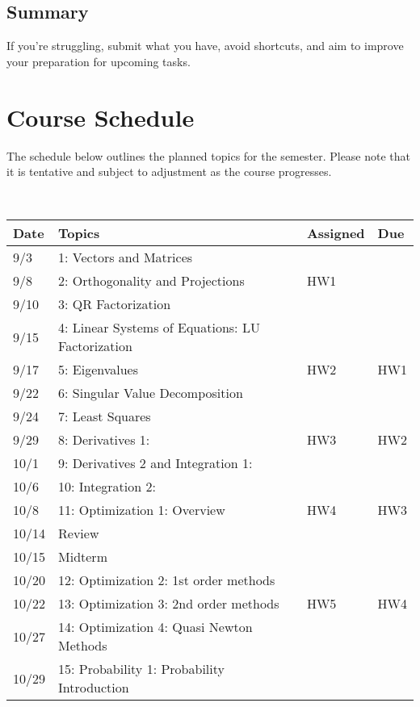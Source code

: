 \documentclass[11pt]{article}
\begin{document}
\subsection*{Summary}

If you're struggling, submit what you have, avoid shortcuts, and aim to improve your preparation for upcoming tasks.

\section*{Course Schedule}

The schedule below outlines the planned topics for the semester. Please note that it is tentative and subject to adjustment as the course progresses.

~\\
\small
\begin{centering}
\begin{tabular}{||l|p{3in}|l|l||}
\hline\hline
Date & Topics  & Assigned & Due  \\
\hline\hline
9/3 & 1: Vectors and Matrices &   & \\
\hline
9/8 & 2: Orthogonality and Projections & HW1   & \\
9/10& 3: QR Factorization &   & \\
\hline
9/15 &  4: Linear Systems of Equations: LU Factorization &  &  \\
9/17& 5: Eigenvalues & HW2 & HW1  \\
\hline
9/22& 6: Singular Value Decomposition &   &   \\
9/24 & 7: Least Squares  &  & \\
\hline
9/29 & 8:  Derivatives 1: & HW3 & HW2  \\ 
10/1 & 9: Derivatives 2 and Integration 1: & & \\
\hline
10/6 & 10: Integration 2: &  &  \\
10/8& 11: Optimization 1: Overview & HW4  & HW3  \\  
\hline 
10/14& Review &  &   \\
10/15 & Midterm& &\\
\hline
10/20 & 12: Optimization 2: 1st order methods   &  &\\
10/22 & 13: Optimization 3: 2nd order methods  &HW5  & HW4 \\ 
\hline
  
10/27 & 14: Optimization 4: Quasi Newton Methods & &  \\  
10/29& 15:  Probability 1: Probability Introduction  & & \\
\hline


\end{tabular}
\end{centering}
\end{document}
